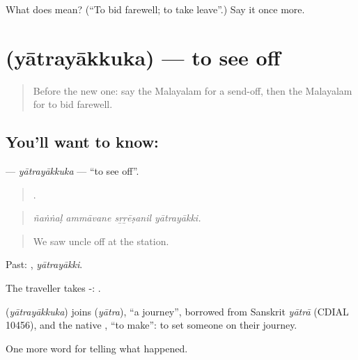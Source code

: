\begin{tcolorbox}[breakable,colback=teal!4,colframe=teal!35!black,title={Before you move on}]
What does  mean? (\textquotedblleft{}To bid farewell; to take leave\textquotedblright{}.) Say it once more.
\end{tcolorbox}
\section[\texorpdfstring{\ml{യാത്രയാക്കുക} (yātrayākkuka)}{യാത്രയാക്കുക (yātrayākkuka)}]{ (yātrayākkuka) — to see off}

\label{lesson:ML-C390-yatrayakkuka}



\begin{quote}
Before the new one: say the Malayalam for a send-off, then the Malayalam for to bid farewell.
\end{quote}

\subsection*{You'll want to know: }
\textbf{} — \emph{yātrayākkuka} — \textquotedblleft{}to see off\textquotedblright{}.

\begin{quote}
   .
\end{quote}

\begin{quote}
\emph{ñaṅṅaḷ ammāvane sṟṟēṣanil yātrayākki.}
\end{quote}

\begin{quote}
We saw uncle off at the station.
\end{quote}

Past: , \emph{yātrayākki}.

The traveller takes -:  .

\begin{cousinweb}
\textbf{} (\emph{yātrayākkuka}) joins  (\emph{yātra}), \textquotedblleft{}a journey\textquotedblright{}, borrowed from Sanskrit \emph{yātrā} (CDIAL 10456), and the native , \textquotedblleft{}to make\textquotedblright{}: to set someone on their journey.
\end{cousinweb}

\begin{grammarlens}[title={What you've built}]
One more word for telling what happened.
\end{grammarlens}

